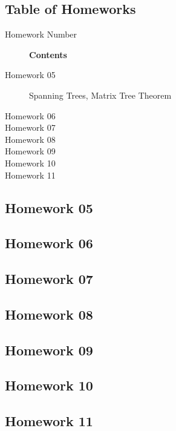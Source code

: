 \subsection{Table of Homeworks}

\begin{description}
\item [Homework Number] \textbf{Contents}
\item [Homework 05] Spanning Trees, Matrix Tree Theorem
\item [Homework 06] 
\item [Homework 07] 
\item [Homework 08] 
\item [Homework 09] 
\item [Homework 10] 
\item [Homework 11] 
\end{description}

\pagebreak

\subsection{Homework 05}


\subsection{Homework 06}


\subsection{Homework 07}


\subsection{Homework 08}


\subsection{Homework 09}


\subsection{Homework 10}


\subsection{Homework 11}


\pagebreak
